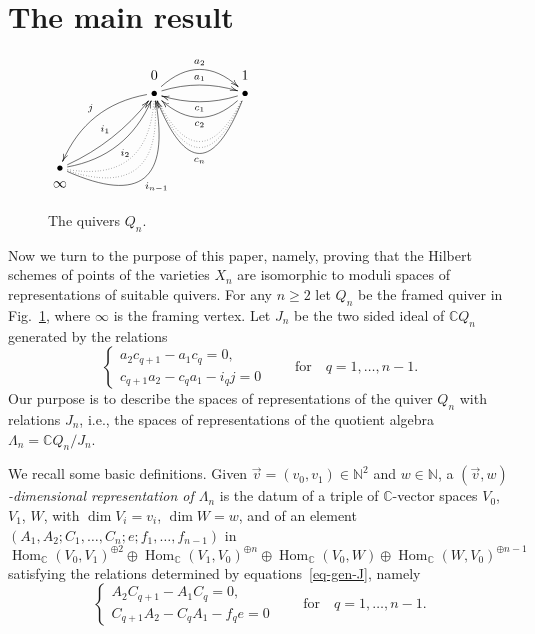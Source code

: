 \documentclass[11pt]{article}
\numberwithin{equation}{section}
\numberwithin{equation}{section}
\begin{document}
\section{The main result}\label{sectionmainresult}

\begin{figure}[t]\centering
$ \xymatrix@R-2.3em{
&&\mbox{\scriptsize$0$}&&\mbox{\scriptsize$1$}\\
&&\bullet\ar@/_3ex/[llddddddd]_{j}\ar@/^/[rr]^{a_{1}}\ar@/^4ex/[rr]^{a_{2}}&&\bullet\ar@/^/[ll]^{c_{1}}
\ar@/^4ex/[ll]^{c_2}\ar@{..}@/^8ex/[ll]\ar@{..}@/^9ex/[ll]
\ar@/^10ex/[ll]^{c_{n}}& \\ \\ \\ \\ \\&&&&& \\ \\
\bullet\ar@/_/[rruuuuuuu]^{i_1}\ar@/_3ex/[rruuuuuuu]_{i_2}\ar@{..}@/_6ex/[rruuuuuuu]\ar@{..}@/_8ex/[rruuuuuuu]\ar@/_10ex/[rruuuuuuu]_{i_{n-1}}&&&&&\\
\mbox{\scriptsize$\infty$}&&&&
}
$
\caption{The quivers $Q_n$.}\label{Qn}
\end{figure}
Now we turn to the purpose of this paper, namely, proving that the Hilbert schemes of points of the varieties $X_n$ are
isomorphic to moduli spaces of representations of suitable quivers.
 For any $n\geq2$ let $Q_{n}$ be the framed quiver in Fig.~\ref{Qn}, where $\infty$ is the framing vertex. Let $J_{n}$ be the two sided ideal of $\mathbb{C} Q_{n}$ generated by the relations
\begin{equation}
\begin{cases}
a_2c_{q+1}-a_1c_q =0,\\
c_{q+1}a_2-c_qa_1-i_qj =0
\end{cases}
\qquad\text{for}\quad q=1,\dots,n-1 .
\label{eq-gen-J}
\end{equation}
Our purpose is to describe the spaces of representations of the quiver $Q_n$ with relations $J_{n}$, i.e., the spaces of representations of the quotient algebra $\Lambda_{n}=\mathbb{C} Q_{n}/J_{n}$.

We recall some basic definitions. Given $\vec{v} = (v_0, v_1)\in \mathbb{N}^2$ and $w\in \mathbb{N}$,
a {\it $(\vec{v},w)$-dimensional representation of $\Lambda_n$}
is the datum of a triple of $\mathbb{C}$-vector spaces $V_0$, $V_1$, $W$, with $\dim V_i = v_i$, $\dim W=w$, and of an element
$(A_1,A_2;C_1, \dots,C_n;e;f_1,\dots,f_{n-1})$ in
\[
\operatorname{Hom}_\mathbb{C}(V_0,V_1)^{\oplus2}\oplus\operatorname{Hom}_\mathbb{C}(V_1,V_0)^{\oplus n}\oplus\operatorname{Hom}_\mathbb{C}(V_0,W)\oplus\operatorname{Hom}_\mathbb{C}(W,V_0)^{\oplus n-1}
\]
 satisfying the relations determined by equations~\eqref{eq-gen-J}, namely
 \begin{equation}
\begin{cases}
A_2 C_{q+1}- A_1 C_q =0,\\
C_{q+1} A_2 - C_q A_1- f_q e =0
\end{cases}
\qquad\text{for}\quad q=1,\dots,n-1 .
\label{eq-gen-Q1}\tag{Q1}
\end{equation}
\end{document}
